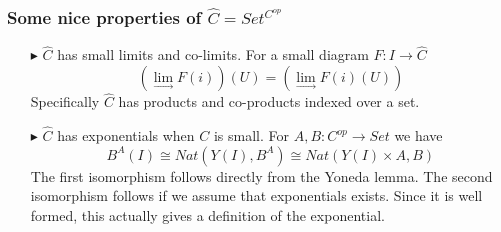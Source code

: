 \documentclass[11pt,compress]{beamer}
\begin{document}


\begin{frame}
\frametitle{Some nice properties of $\widehat{C} = Set^{C^{op}}$}

\begin{enumerate}

\item[$\blacktriangleright$]
$\widehat{C}$ has small limits and co-limits. For a small diagram $F : I \to \widehat{C}$ 
\textcolor{beamer@mathtext}{
\[ (\lim_{\to} F(i))(U) = (\lim_{\to}F(i)(U)) \]
}
Specifically $\widehat{C}$ has products and co-products indexed over a set.

\item[$\blacktriangleright$]
$\widehat{C}$ has exponentials when $C$ is small. For $A, B : C^{op} \to Set$ we have
\textcolor{beamer@mathtext}{
\[ B^A(I) \cong Nat(Y(I), B^A) \cong Nat(Y(I) \times A, B) \]
}
The first isomorphism follows directly from the Yoneda lemma.
The second isomorphism follows if we assume that exponentials exists. 
Since it is well formed, this actually gives a definition of the exponential.

\end{enumerate}

\end{frame}

\end{document}
